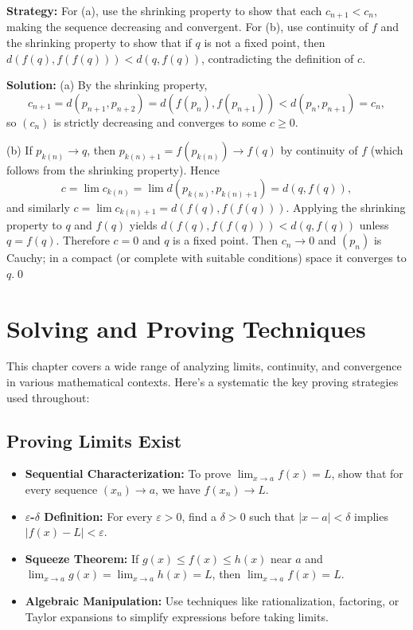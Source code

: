 \noindent\textbf{Strategy:} For (a), use the shrinking property to show that each $c_{n+1} < c_n$, making the sequence decreasing and convergent. For (b), use continuity of $f$ and the shrinking property to show that if $q$ is not a fixed point, then $d(f(q), f(f(q))) < d(q, f(q))$, contradicting the definition of $c$.

\bigskip\noindent\textbf{Solution:}
(a) By the shrinking property,
\[
c_{n+1}=d(p_{n+1},p_{n+2})=d(f(p_n),f(p_{n+1}))<d(p_n,p_{n+1})=c_n,
\]
so $(c_n)$ is strictly decreasing and converges to some $c\ge 0$.

(b) If $p_{k(n)}\to q$, then $p_{k(n)+1}=f(p_{k(n)})\to f(q)$ by continuity of $f$ (which follows from the shrinking property). Hence
\[
c=\lim c_{k(n)}=\lim d(p_{k(n)},p_{k(n)+1})=d(q,f(q)),
\]
and similarly $c=\lim c_{k(n)+1}=d(f(q),f(f(q)))$. Applying the shrinking property to $q$ and $f(q)$ yields $d(f(q),f(f(q)))<d(q,f(q))$ unless $q=f(q)$. Therefore $c=0$ and $q$ is a fixed point. Then $c_n\to 0$ and $(p_n)$ is Cauchy; in a compact (or complete with suitable conditions) space it converges to $q$.\qed

\section{Solving and Proving Techniques}

This chapter covers a wide range of analyzing limits, continuity, and convergence in various mathematical contexts. Here's a systematic the key proving strategies used throughout:

\subsection*{Proving Limits Exist}

\begin{itemize}
\item \textbf{Sequential Characterization:} To prove $\lim_{x \to a} f(x) = L$, show that for every sequence $(x_n) \to a$, we have $f(x_n) \to L$.

\item \textbf{$\varepsilon$-$\delta$ Definition:} For every $\varepsilon > 0$, find a $\delta > 0$ such that $|x - a| < \delta$ implies $|f(x) - L| < \varepsilon$.

\item \textbf{Squeeze Theorem:} If $g(x) \leq f(x) \leq h(x)$ near $a$ and $\lim_{x \to a} g(x) = \lim_{x \to a} h(x) = L$, then $\lim_{x \to a} f(x) = L$.

\item \textbf{Algebraic Manipulation:} Use techniques like rationalization, factoring, or Taylor expansions to simplify expressions before taking limits.
\end{itemize}

